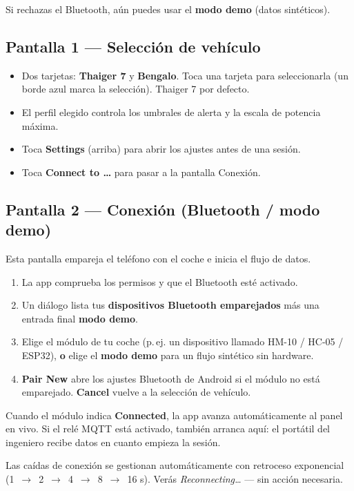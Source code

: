 \documentclass[11pt,a4paper,oneside]{report}
\newcommand{\arrow}{\,$\rightarrow$\,}
\begin{document}
\medskip
Si rechazas el Bluetooth, aún puedes usar el \textbf{modo demo} (datos sintéticos).

\subsection{Pantalla 1 --- Selección de vehículo}
\begin{itemize}
  \item Dos tarjetas: \textbf{Thaiger 7} y \textbf{Bengalo}. Toca una tarjeta para
    seleccionarla (un borde azul marca la selección). Thaiger 7 por defecto.
  \item El perfil elegido controla los umbrales de alerta y la escala de potencia
    máxima.
  \item Toca \textbf{Settings} (arriba) para abrir los ajustes antes de una sesión.
  \item Toca \textbf{Connect to \ldots} para pasar a la pantalla Conexión.
\end{itemize}

\subsection{Pantalla 2 --- Conexión (Bluetooth / modo demo)}
Esta pantalla empareja el teléfono con el coche e inicia el flujo de datos.
\begin{enumerate}
  \item La app comprueba los permisos y que el Bluetooth esté activado.
  \item Un diálogo lista tus \textbf{dispositivos Bluetooth emparejados} más una
    entrada final \textbf{modo demo}.
  \item Elige el módulo de tu coche (p.\,ej. un dispositivo llamado HM-10 / HC-05 /
    ESP32), \textbf{o} elige el \textbf{modo demo} para un flujo sintético sin
    hardware.
  \item \textbf{Pair New} abre los ajustes Bluetooth de Android si el módulo no está
    emparejado. \textbf{Cancel} vuelve a la selección de vehículo.
\end{enumerate}
Cuando el módulo indica \textbf{Connected}, la app avanza automáticamente al panel
en vivo. Si el relé MQTT está activado, también arranca aquí: el portátil del
ingeniero recibe datos en cuanto empieza la sesión.
\begin{tgnote}
Las caídas de conexión se gestionan automáticamente con retroceso exponencial
(1 \arrow{} 2 \arrow{} 4 \arrow{} 8 \arrow{} 16 s). Verás \emph{Reconnecting\ldots}
--- sin acción necesaria.
\end{tgnote}
\end{document}
